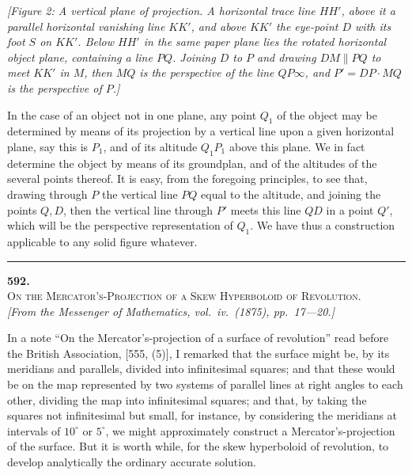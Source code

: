 \documentclass[11pt]{article}
\begin{document}
\medskip
\textit{[Figure 2: A vertical plane of projection. A horizontal trace line $HH'$, above
it a parallel horizontal vanishing line $KK'$, and above $KK'$ the eye-point $D$ with its
foot $S$ on $KK'$. Below $HH'$ in the same paper plane lies the rotated horizontal object
plane, containing a line $PQ$. Joining $D$ to $P$ and drawing $DM\parallel PQ$ to meet
$KK'$ in $M$, then $MQ$ is the perspective of the line $QP\infty$, and $P'=DP\cdot MQ$ is
the perspective of $P$.]}
\medskip

In the case of an object not in one plane, any point $Q_{1}$ of the object may be
determined by means of its projection by a vertical line upon a given horizontal
plane, say this is $P_{1}$, and of its altitude $Q_{1}P_{1}$ above this plane. We in
fact determine the object by means of its groundplan, and of the altitudes of the
several points thereof. It is easy, from the foregoing principles, to see that, drawing
through $P$ the vertical line $PQ$ equal to the altitude, and joining the points $Q,D$,
then the vertical line through $P'$ meets this line $QD$ in a point $Q'$, which will
be the perspective representation of $Q_{1}$. We have thus a construction applicable
to any solid figure whatever.

\bigskip
\hrule
\bigskip


\begin{center}
{\large\textbf{592.}}\\[4pt]
{\scshape On the Mercator's-Projection of a Skew Hyperboloid of Revolution.}\\[4pt]
\textit{[From the \textit{Messenger of Mathematics}, vol.\ iv.\ (1875), pp.\ 17---20.]}
\end{center}

\medskip

In a note ``On the Mercator's-projection of a surface of revolution'' read before the
British Association, [555, (5)], I remarked that the surface might be, by its meridians
and parallels, divided into infinitesimal squares; and that these would be on the map
represented by two systems of parallel lines at right angles to each other, dividing the
map into infinitesimal squares; and that, by taking the squares not infinitesimal but
small, for instance, by considering the meridians at intervals of $10^{\circ}$ or
$5^{\circ}$, we might approximately construct a Mercator's-projection of the surface.
But it is worth while, for the skew hyperboloid of revolution, to develop analytically
the ordinary accurate solution.
\end{document}

